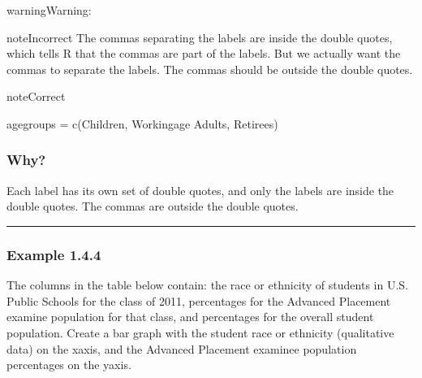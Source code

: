\documentclass[letterpaper,10pt,english]{jupyterBook}
\begin{document}
\begin{sphinxadmonition}{warning}{Warning:}
\begin{sphinxadmonition}{note}{Incorrect}
\sphinxAtStartPar
The commas separating the labels are inside the double quotes, which tells R that the commas are part of the labels. But we actually want the commas to separate the labels. The commas should be outside the double quotes.
\end{sphinxadmonition}

\begin{sphinxadmonition}{note}{Correct}

\begin{sphinxVerbatim}[commandchars=\\\{\}]
age\PYGZus{}groups = c(\PYGZdq{}Children\PYGZdq{}, \PYGZdq{}Working\PYGZhy{}age Adults\PYGZdq{}, \PYGZdq{}Retirees\PYGZdq{})
\end{sphinxVerbatim}
\subsubsection*{Why?}

\sphinxAtStartPar
Each label has its own set of double quotes, and only the labels are inside the double quotes. The commas are outside the double quotes.
\end{sphinxadmonition}
\end{sphinxadmonition}


\bigskip\hrule\bigskip



\subsubsection{Example 1.4.4}
\label{\detokenize{Ch1 Sampling and Data/1.4 Tables and Charts:example-1-4-4}}
\sphinxAtStartPar
The columns in the table below contain: the race or ethnicity of students in U.S. Public Schools for the class of 2011, percentages for the Advanced Placement examine population for that class, and percentages for the overall student population. Create a bar graph with the student race or ethnicity (qualitative data) on the x\sphinxhyphen{}axis, and the Advanced Placement examinee population percentages on the y\sphinxhyphen{}axis.
\end{document}
